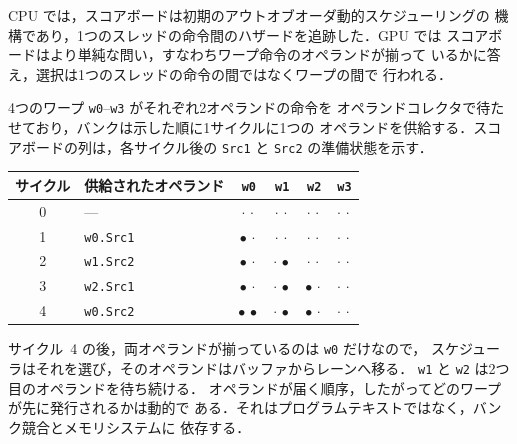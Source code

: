 \documentclass[../main.tex]{subfiles}
\begin{document}
CPU では，スコアボードは初期のアウトオブオーダ動的スケジューリングの
機構であり，1つのスレッドの命令間のハザードを追跡した．GPU では
スコアボードはより単純な問い，すなわちワープ命令のオペランドが揃って
いるかに答え，選択は1つのスレッドの命令の間ではなくワープの間で
行われる．

\begin{example}
  \label{ex:l04-scoreboard}
  4つのワープ \texttt{w0}--\texttt{w3} がそれぞれ2オペランドの命令を
  オペランドコレクタで待たせており，バンクは示した順に1サイクルに1つの
  オペランドを供給する．スコアボードの列は，各サイクル後の
  \texttt{Src1} と \texttt{Src2} の準備状態を示す．
  \begin{center}
    \begin{tabular}{clcccc}
      \toprule
      サイクル & 供給されたオペランド & \texttt{w0} & \texttt{w1} & \texttt{w2} & \texttt{w3} \\
      \midrule
      0 & --- & $\cdot\,\cdot$ & $\cdot\,\cdot$ & $\cdot\,\cdot$ & $\cdot\,\cdot$ \\
      1 & \texttt{w0.Src1} & $\bullet\,\cdot$ & $\cdot\,\cdot$ & $\cdot\,\cdot$ & $\cdot\,\cdot$ \\
      2 & \texttt{w1.Src2} & $\bullet\,\cdot$ & $\cdot\,\bullet$ & $\cdot\,\cdot$ & $\cdot\,\cdot$ \\
      3 & \texttt{w2.Src1} & $\bullet\,\cdot$ & $\cdot\,\bullet$ & $\bullet\,\cdot$ & $\cdot\,\cdot$ \\
      4 & \texttt{w0.Src2} & $\bullet\,\bullet$ & $\cdot\,\bullet$ & $\bullet\,\cdot$ & $\cdot\,\cdot$ \\
      \bottomrule
    \end{tabular}
  \end{center}
  サイクル~4 の後，両オペランドが揃っているのは \texttt{w0} だけなので，
  スケジューラはそれを選び，そのオペランドはバッファからレーンへ移る．
  \texttt{w1} と \texttt{w2} は2つ目のオペランドを待ち続ける．
  オペランドが届く順序，したがってどのワープが先に発行されるかは動的で
  ある．それはプログラムテキストではなく，バンク競合とメモリシステムに
  依存する．
\end{example}
\end{document}
